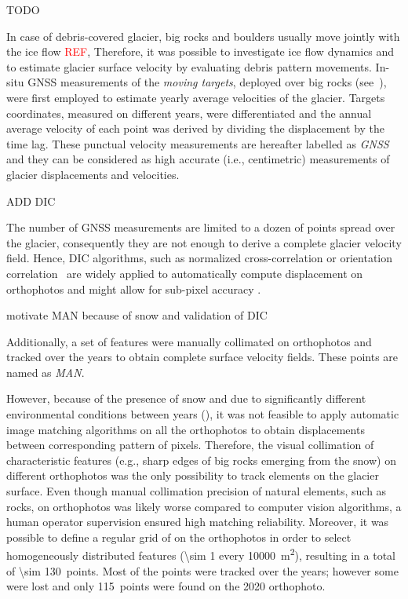 {\color{red} TODO}

In case of debris-covered glacier, big rocks and boulders usually move jointly with the ice flow \textcolor{red}{REF}, 
Therefore, it was possible to investigate ice flow dynamics and to estimate glacier surface velocity by evaluating debris pattern movements.
In-situ GNSS measurements of the \textit{moving targets}, deployed over big rocks (see~),  were first employed to estimate yearly average velocities of the glacier.
Targets coordinates, measured on different years, were differentiated and the annual average velocity of each point was derived by dividing the displacement by the time lag. 
These punctual velocity measurements are hereafter labelled as \textit{GNSS} and they can be considered as high accurate (i.e., centimetric) measurements of glacier displacements and velocities.

{\color{red} ADD DIC}

The number of GNSS measurements are limited to a dozen of points spread over the glacier, consequently they are not enough to derive a complete glacier velocity field.
Hence, DIC algorithms, such as normalized cross-correlation or orientation correlation~\citep{Heid2012_evaluation_xcorr} are widely applied to automatically compute displacement on orthophotos and might allow for sub-pixel accuracy \citep{Debella_Gilo2011}.	

{\color{red} motivate MAN because of snow and validation of DIC}

Additionally, a set of features were manually collimated on orthophotos and tracked over the years to obtain complete surface velocity fields.
These points are named as \textit{MAN}.

However, because of the presence of snow and due to significantly different environmental conditions between years (), it was not feasible to apply automatic image matching algorithms on all the orthophotos to obtain displacements between corresponding pattern of pixels. 
Therefore, the visual collimation of characteristic features (e.g., sharp edges of big rocks emerging from the snow) on different orthophotos was the only possibility to track elements on the glacier surface. 
Even though manual collimation precision of natural elements, such as rocks, on orthophotos was likely worse compared to computer vision algorithms, a human operator supervision ensured high matching reliability.
Moreover, it was possible to define a regular grid of  on the orthophotos in order to select homogeneously distributed features (\qty{\sim 1}{\pt} every \qty{10000}{\meter\squared}), resulting in a total of \qty{\sim 130}{points}.
Most of the points were tracked over the years; however some were lost and only \qty{115}{points} were found on the 2020 orthophoto.


